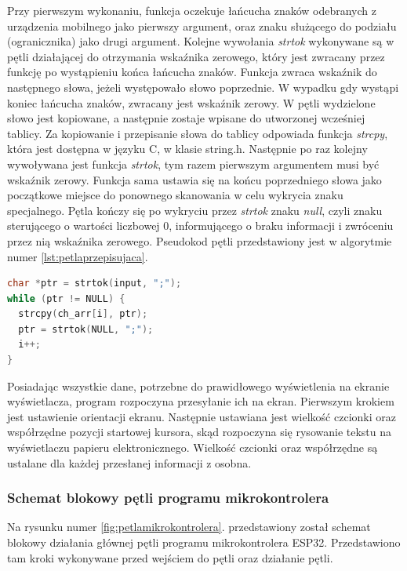 \documentclass[a4paper,12pt, twoside]{article}
\begin{document}
    	Przy pierwszym wykonaniu, funkcja oczekuje łańcucha znaków odebranych z urządzenia mobilnego jako pierwszy argument, oraz znaku służącego do podziału (ogranicznika) jako drugi argument. Kolejne wywołania \textit{strtok} wykonywane są w pętli działającej do otrzymania wskaźnika zerowego, który jest zwracany przez funkcję po wystąpieniu końca łańcucha znaków. Funkcja zwraca wskaźnik do następnego słowa, jeżeli występowało słowo poprzednie. W wypadku gdy wystąpi koniec łańcucha znaków, zwracany jest wskaźnik zerowy. W pętli wydzielone słowo jest kopiowane, a następnie zostaje wpisane do utworzonej wcześniej tablicy. Za kopiowanie i przepisanie słowa do tablicy odpowiada funkcja \textit{strcpy}\cite{strcpy}, która jest dostępna w języku C, w klasie string.h. Następnie po raz kolejny wywoływana jest funkcja \textit{strtok}, tym razem pierwszym argumentem musi być wskaźnik zerowy. Funkcja sama ustawia się na końcu poprzedniego słowa jako początkowe miejsce do ponownego skanowania w celu wykrycia znaku specjalnego. Pętla kończy się po wykryciu przez \textit{strtok} znaku \textit{null}, czyli znaku sterującego o wartości liczbowej 0, informującego o braku informacji\cite{null} i zwróceniu przez nią wskaźnika zerowego. Pseudokod pętli przedstawiony jest w algorytmie numer \ref{lst:petlaprzepisujaca}.
    \begin{lstlisting}[language=C++, label={lst:petlaprzepisujaca}, caption=Działanie pętli przepisującej otrzymane dane do tablicy]
char *ptr = strtok(input, ";");
while (ptr != NULL) {
  strcpy(ch_arr[i], ptr);
  ptr = strtok(NULL, ";");
  i++;
}\end{lstlisting}
    
    	Posiadając wszystkie dane, potrzebne do prawidłowego wyświetlenia na ekranie wyświetlacza, program rozpoczyna przesyłanie ich na ekran. Pierwszym krokiem jest ustawienie orientacji ekranu. Następnie ustawiana jest wielkość czcionki oraz współrzędne pozycji startowej kursora, skąd rozpoczyna się rysowanie tekstu na wyświetlaczu papieru elektronicznego. Wielkość czcionki oraz współrzędne są ustalane dla każdej przesłanej informacji z osobna.
    	
    	\subsubsection{Schemat blokowy pętli programu mikrokontrolera}
    	Na rysunku numer \ref{fig:petlamikrokontrolera}. przedstawiony został schemat blokowy działania głównej pętli programu mikrokontrolera ESP32. Przedstawiono tam kroki wykonywane przed wejściem do pętli oraz działanie pętli.
 
\end{document}
